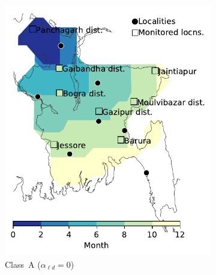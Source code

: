 \documentclass[11pt]{article}
\newcommand{\ald}{\alpha_{\ell d}}
\theoremstyle{definition}
\begin{document}
\begin{figure}[t]
    \centering
\begin{subfigure}[b]{.3\textwidth}
    \includegraphics[width=\textwidth]{../cellular_automata/results/contour/BGD_model-A.pdf}
    \caption{Class~A ($\ald=0$) \label{fig:bgdClassA}}
\end{subfigure}\hspace{.5cm}
\begin{subfigure}[b]{.3\textwidth}

\end{subfigure}
\end{figure}
\end{document}
